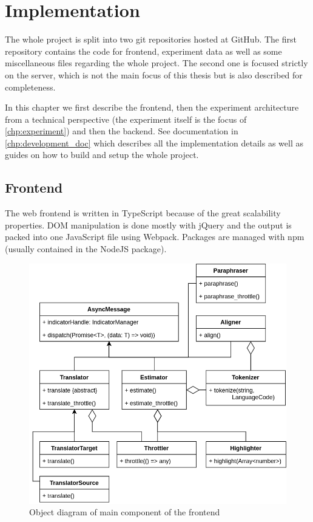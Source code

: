\chapter{Implementation} \label{chp:implementation}

The whole project is split into two git repositories hosted at GitHub. The first repository contains the code for frontend, experiment data as well as some miscellaneous files regarding the whole project. The second one is focused strictly on the server, which is not the main focus of this thesis but is also described for completeness.

In this chapter we first describe the frontend, then the experiment architecture from a technical perspective (the experiment itself is the focus of \cref{chp:experiment}) and then the backend. See documentation in \cref{chp:development_doc} which describes all the implementation details as well as guides on how to build and setup the whole project.

\section{Frontend}
\label{sec:implementation:frontend_structure}

The web frontend is written in TypeScript because of the great scalability properties. DOM manipulation is done mostly with jQuery and the output is packed into one JavaScript file using Webpack. Packages are managed with npm (usually contained in the NodeJS package).

\begin{figure}[ht]
    \centering
    \includegraphics[width=\textwidth]{img/implementation/frontend.png}
    \caption{Object diagram of main component of the \ptakopet{} frontend}
    \label{fig:frontend_class}
\end{figure}

